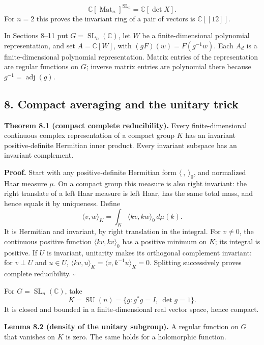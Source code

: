 \documentclass[
]{article}
\begin{document}
\[
\mathbb C [\operatorname{Mat}_n]^{\operatorname{SL}_n}=\mathbb C [\det X].
\tag{H1}
\] For \(n=2\) this proves the invariant ring of a pair of vectors is
\(\mathbb C [[12]]\).

In Sections 8--11 put \(G=\operatorname{SL}_n(\mathbb C)\), let \(W\) be
a finite-dimensional polynomial representation, and set
\(A=\mathbb C [W]\), with \((gF)(w)=F(g^{-1}w)\). Each \(A_d\) is a
finite-dimensional polynomial representation. Matrix entries of the
representation are regular functions on \(G\); inverse matrix entries
are polynomial there because \(g^{-1}=\operatorname{adj}(g)\).

\subsection{8. Compact averaging and the unitary trick}\label{section-8}

\protect{}\label{theorem-8-1}{}

\textbf{Theorem 8.1 (compact complete reducibility).} Every
finite-dimensional continuous complex representation of a compact group
\(K\) has an invariant positive-definite Hermitian inner product. Every
invariant subspace has an invariant complement.

\textbf{Proof.} Start with any positive-definite Hermitian form
\(\langle\ ,\ \rangle_0\), and normalized Haar measure \(\mu\). On a
compact group this measure is also right invariant: the right translate
of a left Haar measure is left Haar, has the same total mass, and hence
equals it by uniqueness. Define \[
\langle v,w\rangle_K=\int_K
\langle kv,kw\rangle_0\,d\mu(k).
\] It is Hermitian and invariant, by right translation in the integral.
For \(v\ne0\), the continuous positive function
\(\langle kv,kv\rangle_0\) has a positive minimum on \(K\); its integral
is positive. If \(U\) is invariant, unitarity makes its orthogonal
complement invariant: for \(v\perp U\) and \(u\in U\),
\(\langle kv,u\rangle_K=\langle v,k^{-1}u\rangle_K=0\). Splitting
successively proves complete reducibility. \(\square\)

For \(G=\operatorname{SL}_n(\mathbb C)\), take \[
K=\operatorname{SU}(n)=\{g:g^*g=I,\ \det g=1\}.
\] It is closed and bounded in a finite-dimensional real vector space,
hence compact.

\protect{}\label{lemma-8-2}{}

\textbf{Lemma 8.2 (density of the unitary subgroup).} A regular function
on \(G\) that vanishes on \(K\) is zero. The same holds for a
holomorphic function.
\end{document}
